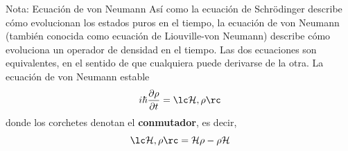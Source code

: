     
    \begin{mybox_blue}{Nota: Ecuación de von Neumann}
        Así como la ecuación de Schrödinger describe cómo evolucionan los estados puros en el tiempo, la 
        ecuación de von Neumann (también conocida como ecuación de Liouville-von Neumann) describe cómo 
        evoluciona un operador de densidad en el tiempo. Las dos ecuaciones son equivalentes, en el 
        sentido de que cualquiera puede derivarse de la otra. La ecuación de von Neumann estable
        \begin{equation}
        i \hbar \frac{\partial \rho}{\partial t} = \lc \mathcal{H}, \rho \rc
        \end{equation}
        donde los corchetes denotan el \textbf{conmutador}, es decir,
        \begin{equation}
        \lc \mathcal{H}, \rho \rc = \mathcal{H} \rho - \rho \mathcal{H}
        \end{equation}
    \end{mybox_blue}
    
